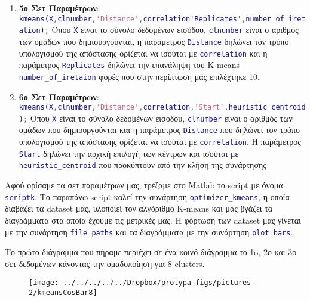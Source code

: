 \begin{enumerate}
    \item  \textbf{5ο Σετ Παραμέτρων}:
\lstinline[language=MATLAB]!kmeans(X,clnumber,'Distance',correlation'Replicates',number_of_iretation);!
Όπου \lstinline[language=MATLAB]!X! είναι το σύνολο δεδομένων εισόδου, \lstinline[language=MATLAB]!clnumber! είναι ο αριθμός των ομάδων που δημιουργούνται, η παράμετρος \lstinline[language=MATLAB]!Distance! δηλώνει τον τρόπο υπολογισμού της απόστασης ορίζεται να ισούται με \lstinline[language=MATLAB]!correlation! και η παράμετρος \lstinline[language=MATLAB]!Replicates! δηλώνει την επανάληψη του K-means \lstinline[language=MATLAB]!number_of_iretaion! φορές που στην περίπτωση μας επιλέχτηκε 10. 
    \item  \textbf{6ο Σετ Παραμέτρων}:
\lstinline[language=MATLAB]!kmeans(X,clnumber,'Distance',correlation,'Start',heuristic_centroid);!
Όπου \lstinline[language=MATLAB]!X! είναι το σύνολο δεδομένων εισόδου, \lstinline[language=MATLAB]!clnumber! είναι ο αριθμός των ομάδων που δημιουργούνται και η παράμετρος \lstinline[language=MATLAB]!Distance! που δηλώνει τον τρόπο υπολογισμού της απόστασης ορίζεται να ισούται με \lstinline[language=MATLAB]!correlation!. Η παράμετρος \lstinline[language=MATLAB]!Start! δηλώνει την αρχική επιλογή των κέντρων και ισούται με \lstinline[language=MATLAB]!heuristic_centroid! που προκύπτουν από την κλήση της συνάρτησης
\end{enumerate}

Αφού ορίσαμε τα σετ παραμέτρων μας, τρέξαμε στο Matlab το script με όνομα \lstinline[language=MATLAB]!scriptk!. Tο παραπάνω script καλεί την συνάρτηση \lstinline[language=MATLAB]!optimizer_kmeans!, η οποία διαβάζει τα dataset μας, υλοποιεί τον αλγόριθμο K-means και μας βγάζει τα διαγράμματα στα οποία έχουμε τις μετρικές μας. Η φόρτωση των dataset μας γίνεται με την συνάρτηση \lstinline[language=MATLAB]!file_paths! και τα διαγράμματα με την συνάρτηση \lstinline[language=MATLAB]!plot_bars!.

Το πρώτο διάγραμμα που πήραμε περιέχει σε ένα κοινό διάγραμμα το 1o, 2ο και 3ο σετ δεδομένων κάνοντας την ομαδοποίηση για 8 clusters.

\begin{figure}
\centering
\texttt{[image: ../../../../../Dropbox/protypa-figs/pictures-2/kmeansCosBar8]}
\caption{}
\label{fig:kmeansCosBar8}
\end{figure}

